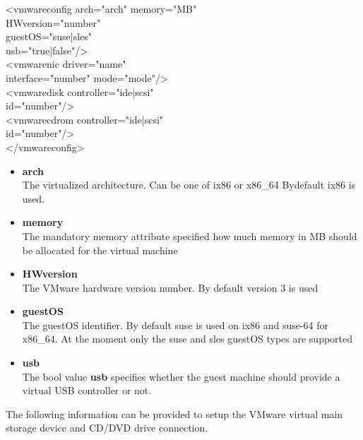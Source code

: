 \begin{itemize}
	\begin{Command}{12cm}
	<vmwareconfig arch="arch" memory="MB"\\
	\hspace*{2.5cm}HWversion="number"\\
	\hspace*{2.5cm}guestOS="suse|sles"\\
	\hspace*{2.5cm}usb="true|false"/>\\
	\hspace*{1cm}<vmwarenic driver="name"\\
	\hspace*{2.5cm}interface="number" mode="mode"/>\\
	\hspace*{1cm}<vmwaredisk controller="ide|scsi"\\
	\hspace*{2.5cm}id="number"/>\\
	\hspace*{1cm}<vmwarecdrom controller="ide|scsi"\\
	\hspace*{2.5cm}id="number"/>\\
	</vmwareconfig>
	\end{Command}

	\begin{itemize}
	\item \textbf{arch}\\
      The virtualized architecture. Can be one of ix86 or x86\_64
      Bydefault ix86 is used.
	\item \textbf{memory}\\
      The mandatory memory attribute specified how much memory in MB
      should be allocated for the virtual machine
	\item \textbf{HWversion}\\
      The VMware hardware version number. By default version 3 is used
	\item \textbf{guestOS}\\
      The guestOS identifier. By default suse is used on ix86 and suse-64
      for x86\_64. At the moment only the suse and sles guestOS types
      are supported
	\item \textbf{usb}\\
      The bool value \textbf{usb} specifies whether the guest machine
      should provide a virtual USB controller or not.
	\end{itemize}

	The following information can be provided to setup the VMware virtual
	main storage device and CD/DVD drive connection.


\end{itemize}
